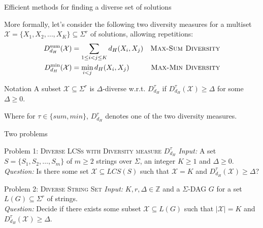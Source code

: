 \documentclass{beamer}
\begin{document}
\begin{frame}{Efficient methods for finding a diverse set of solutions}

    More formally, let's consider the following two diversity measures for a multiset $\mathcal{X} = \{X_1, X_2, \ldots, X_K\} \subseteq \Sigma^r$ of solutions, allowing repetitions:
    \begin{align}
        D_{d_H}^{\text{sum}} (\mathcal{X}) &= \sum_{1 \leq i < j \leq K} d_H(X_i, X_j) & \text{\textsc{Max-Sum Diversity}} \\
        D_{d_H}^{\text{min}} (\mathcal{X}) &= \min_{i < j} d_H(X_i, X_j) & \text{\textsc{Max-Min Diversity}}
    \end{align}

    \begin{block}{Notation}
        A subset $\mathcal{X} \subseteq \Sigma^r$ is $\Delta$-diverse w.r.t. $D_{d_H}^{\tau}$ if $D_{d_H}^{\tau}(\mathcal{X}) \geq \Delta$ for some $\Delta \geq 0$.
    \end{block}
    Where for $\tau \in \{sum, min\}$, $D_{d_H}^{\tau}$ denotes one of the two diversity measures.
\end{frame}


\begin{frame}{Two problems}

    \begin{alertblock}{Problem 1: \textsc{Diverse LCSs with Diversity measure} $D_{d_H}^{\tau}$}
        \emph{Input:} A set $S = \{S_1, S_2, \ldots, S_m\}$ of $m \geq 2$ strings over $\Sigma$, an integer $K \geq 1$ and $\Delta \geq 0$. \\
        \emph{Question:} Is there some set $\mathcal{X} \subseteq LCS(S)$ such that $\mathcal{X}= K$ and $D_{d_H}^{\tau}(\mathcal{X}) \geq \Delta$?
    \end{alertblock}
    \begin{alertblock}{Problem 2: \textsc{Diverse String Set}}
        \emph{Input:} $K, r, \Delta \in \mathbb{Z}$ and a $\Sigma$-DAG $G$ for a set $L(G) \subseteq \Sigma^r$ of strings. \\
        \emph{Question:} Decide if there exists some subset $\mathcal{X} \subseteq L(G)$ such that $|\mathcal{X}| = K$ and $D_{d_H}^{\tau}(\mathcal{X}) \geq \Delta$.
    \end{alertblock}

\end{frame}
\end{document}
